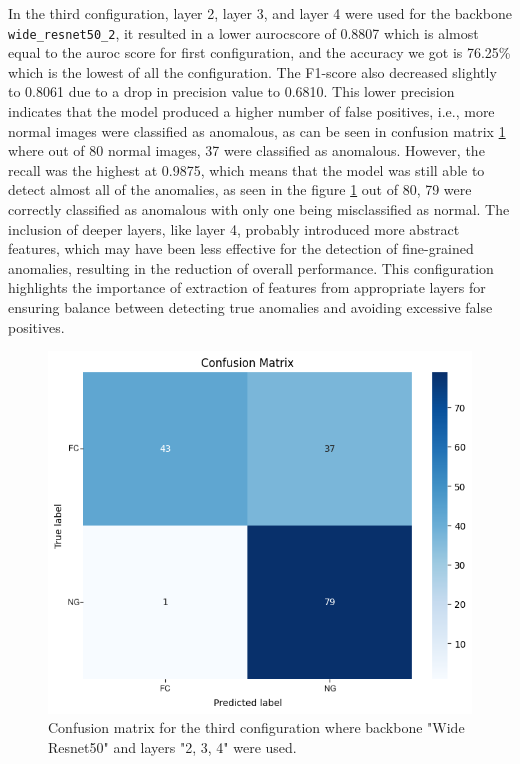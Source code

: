 In the third configuration, layer 2, layer 3, and layer 4 were used for the backbone \texttt{wide\_resnet50\_2}, it resulted in a lower \gls{auroc}score of 0.8807 which is almost equal to the \gls{auroc} score for first configuration, and the accuracy we got is 76.25\% which is the lowest of all the configuration. The F1-score also decreased slightly to 0.8061 due to a drop in precision value to 0.6810. This lower precision indicates that the model produced a higher number of false positives, i.e., more normal images were classified as anomalous, as can be seen in confusion matrix \ref{fig:patchcore config3 confusion matrix} where out of 80 normal images, 37 were classified as anomalous. However, the recall was the highest at 0.9875, which means that the model was still able to detect almost all of the anomalies, as seen in the figure \ref{fig:patchcore config3 confusion matrix} out of 80, 79 were correctly classified as anomalous with only one being misclassified as normal. The inclusion of deeper layers, like layer 4, probably introduced more abstract features, which may have been less effective for the detection of fine-grained anomalies, resulting in the reduction of overall performance. This configuration highlights the importance of extraction of features from appropriate layers for ensuring balance between detecting true anomalies and avoiding excessive false positives.

\begin{figure}[ht!]
    \centering
    \includegraphics[width=1\linewidth]{Rohit_Master_Thesis//Images/patchcore_config3_confusion_matrix.png}
    \caption{Confusion matrix for the third configuration where backbone "Wide Resnet50" and layers "2, 3, 4" were used.}
    \label{fig:patchcore config3 confusion matrix}
\end{figure}

